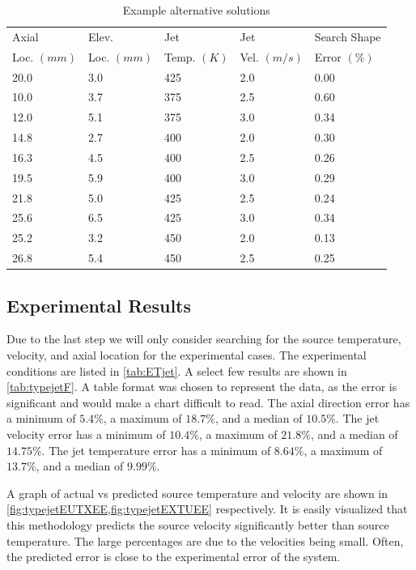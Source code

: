 \documentclass[preprint,12pt]{elsarticle}
\begin{document}
\begin{table}[!t!b!p]
\begin{center}
\begin{tabular}{ l l l l l }
\hline
Axial    		& Elev.		& Jet		  	& Jet			& Search Shape \\
Loc. $(mm)$ & Loc. $(mm)$	& Temp. $(K)$ 	& Vel. $(m/s)$	& Error $(\%)$\\ \hline
20.0 &	3.0	&	425	&	2.0	&	0.00 \\ \hline
10.0 &  3.7 &	375 &	2.5 &	0.60 \\
12.0 &	5.1 &	375	&	3.0	&	0.34 \\
14.8 &	2.7 &	400	&	2.0	&	0.30 \\
16.3 &	4.5 &	400	&	2.5	&	0.26 \\
19.5 &	5.9 &	400	&	3.0	&	0.29 \\
21.8 &	5.0 &	425	&	2.5	&	0.24 \\
25.6 &	6.5 &	425	&	3.0	&	0.34 \\
25.2 &	3.2 &	450	&	2.0	&	0.13 \\
26.8 &	5.4 &	450	&	2.5	&	0.25 \\
\hline
\end{tabular}
\caption{Example alternative solutions\cite{vanderveer}}
\label{tab:alternatives}
\end{center}
\end{table}

\subsection{Experimental Results}
Due to the last step we will only consider searching for the source temperature, velocity, and axial location for the experimental cases.  The experimental conditions are listed in \cref{tab:ETjet}.  A select few results are shown in \cref{tab:typejetF}.  A table format was chosen to represent the data, as the error is significant and would make a chart difficult to read.  The axial direction error has a minimum of $5.4\%$, a maximum of $18.7\%$, and a median of $10.5\%$.  The jet velocity error has a minimum of $10.4\%$, a maximum of $21.8\%$, and a median of $14.75\%$.  The jet temperature error has a minimum of $8.64\%$, a maximum of $13.7\%$, and a median of $9.99\%$.

A graph of actual vs predicted source temperature and velocity are shown in \cref{fig:typejetEUTXEE,fig:typejetEXTUEE} respectively.  It is easily visualized that this methodology predicts the source velocity significantly better than source temperature.  The large percentages are due to the velocities being small.  Often, the predicted error is close to the experimental error of the system.
\end{document}
